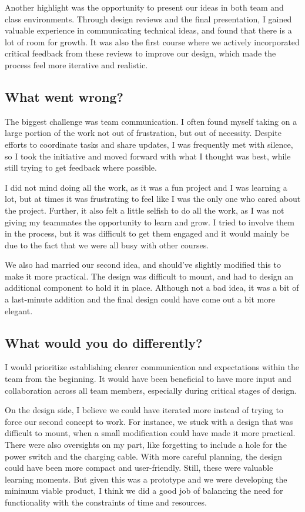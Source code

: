 \documentclass{article}
\begin{document}
Another highlight was the opportunity to present our ideas in both team and class environments. Through design reviews and the final presentation, I gained valuable experience in communicating technical ideas, and found that there is a lot of room for growth. It was also the first course where we actively incorporated critical feedback from these reviews to improve our design, which made the process feel more iterative and realistic.

\subsection{What went wrong?}

The biggest challenge was team communication. I often found myself taking on a large portion of the work not out of frustration, but out of necessity. Despite efforts to coordinate tasks and share updates, I was frequently met with silence, so I took the initiative and moved forward with what I thought was best, while still trying to get feedback where possible.

I did not mind doing all the work, as it was a fun project and I was learning a lot, but at times it was frustrating to feel like I was the only one who cared about the project. Further, it also felt a little selfish to do all the work, as I was not giving my teammates the opportunity to learn and grow. I tried to involve them in the process, but it was difficult to get them engaged and it would mainly be due to the fact that we were all busy with other courses.

We also had married our second idea, and should've slightly modified this to make it more practical. The design was difficult to mount, and had to design an additional component to hold it in place. Although not a bad idea, it was a bit of a last-minute addition and the final design could have come out a bit more elegant.

\subsection{What would you do differently?}

I would prioritize establishing clearer communication and expectations within the team from the beginning. It would have been beneficial to have more input and collaboration across all team members, especially during critical stages of design.

On the design side, I believe we could have iterated more instead of trying to force our second concept to work. For instance, we stuck with a design that was difficult to mount, when a small modification could have made it more practical. There were also oversights on my part, like forgetting to include a hole for the power switch and the charging cable. With more careful planning, the design could have been more compact and user-friendly. Still, these were valuable learning moments. But given this was a prototype and we were developing the minimum viable product, I think we did a good job of balancing the need for functionality with the constraints of time and resources.
\end{document}
